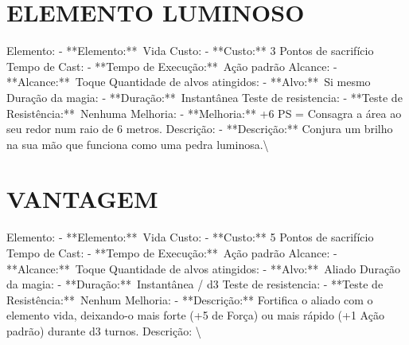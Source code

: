 \documentclass{article}%
\begin{document}
\section{ELEMENTO LUMINOSO}%
\label{sec:ELEMENTOLUMINOSO}%
Elemento: {-} **Elemento:**~Vida\newline%
Custo: {-} **Custo:** 3 Pontos de sacrifício\newline%
Tempo de Cast: {-} **Tempo de Execução:**~Ação padrão\newline%
Alcance: {-} **Alcance:**~Toque\newline%
Quantidade de alvos atingidos: {-} **Alvo:**~Si mesmo\newline%
Duração da magia: {-} **Duração:**~Instantânea\newline%
Teste de resistencia: {-} **Teste de Resistência:**~Nenhuma\newline%
Melhoria: {-} **Melhoria:** +6 PS = Consagra a área ao seu redor num raio de 6 metros.\newline%
Descrição: {-} **Descrição:** Conjura um brilho na sua mão que funciona como uma pedra luminosa.\textbackslash{}

%
\section{VANTAGEM}%
\label{sec:VANTAGEM}%
Elemento: {-} **Elemento:**~Vida\newline%
Custo: {-} **Custo:** 5 Pontos de sacrifício\newline%
Tempo de Cast: {-} **Tempo de Execução:**~Ação padrão\newline%
Alcance: {-} **Alcance:**~Toque\newline%
Quantidade de alvos atingidos: {-} **Alvo:**~Aliado\newline%
Duração da magia: {-} **Duração:**~Instantânea / d3\newline%
Teste de resistencia: {-} **Teste de Resistência:**~Nenhum\newline%
Melhoria: {-} **Descrição:** Fortifica o aliado com o elemento vida, deixando{-}o mais forte (+5 de Força) ou mais rápido (+1 Ação padrão) durante d3 turnos.\newline%
Descrição: \textbackslash{}

%
\end{document}
